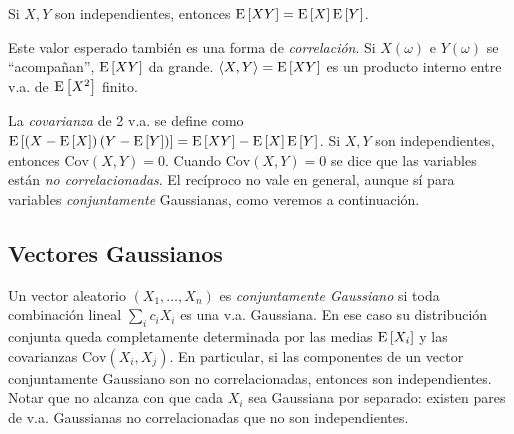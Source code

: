 \begin{proposicion}
    Si $X,Y$ son independientes, entonces $\mathrm{E}\left[XY\right]=\mathrm{E}\left[X\right]\mathrm{E}\left[Y\right]$.
\end{proposicion}

Este valor esperado también es una forma de \emph{correlación}. Si
$X(\omega)$ e $Y(\omega)$ se ``acompañan'', $\mathrm{E}\left[XY\right]$ da grande.
$\langle X,Y\rangle=\mathrm{E}\left[XY\right]$ es un producto interno entre v.a. de
$\mathrm{E}\left[X^2\right]$ finito.

La \emph{covarianza} de 2 v.a. se define como
$\mathrm{E}\left[\left(X-\mathrm{E}\left[X\right]\right)\left(Y-\mathrm{E}\left[Y\right]\right)\right]=\mathrm{E}\left[XY\right]-\mathrm{E}\left[X\right]\mathrm{E}\left[Y\right]$.
Si $X,Y$ son independientes, entonces $\mathrm{Cov}(X,Y)=0$. Cuando $\mathrm{Cov}(X,Y)=0$ se dice que las variables están \emph{no correlacionadas}. El recíproco no vale en general, aunque sí para variables \emph{conjuntamente} Gaussianas, como veremos a continuación.

\subsection*{Vectores Gaussianos}

Un vector aleatorio $(X_1,\ldots,X_n)$ es \emph{conjuntamente Gaussiano} si toda combinación lineal $\sum_i c_i X_i$ es una v.a. Gaussiana. En ese caso su distribución conjunta queda completamente determinada por las medias $\mathrm{E}\left[X_i\right]$ y las covarianzas $\mathrm{Cov}(X_i,X_j)$. En particular, si las componentes de un vector conjuntamente Gaussiano son no correlacionadas, entonces son independientes. Notar que no alcanza con que cada $X_i$ sea Gaussiana por separado: existen pares de v.a. Gaussianas no correlacionadas que no son independientes.
